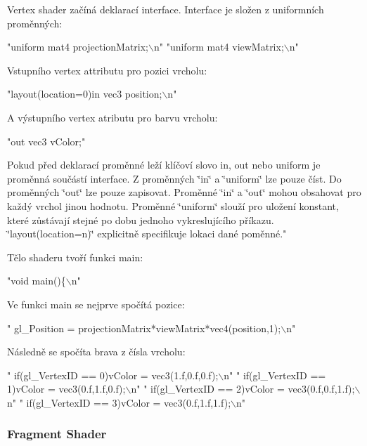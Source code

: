 Vertex shader začíná deklarací interface. Interface je složen z uniformních proměnných\-: 
\begin{DoxyCodeInclude}
\textcolor{stringliteral}{"uniform mat4 projectionMatrix;\(\backslash\)n"}
\textcolor{stringliteral}{"uniform mat4 viewMatrix;\(\backslash\)n"}
\end{DoxyCodeInclude}
Vstupního vertex attributu pro pozici vrcholu\-: 
\begin{DoxyCodeInclude}
\textcolor{stringliteral}{"layout(location=0)in vec3 position;\(\backslash\)n"}
\end{DoxyCodeInclude}
A výstupního vertex atributu pro barvu vrcholu\-: 
\begin{DoxyCodeInclude}
\textcolor{stringliteral}{"out vec3 vColor;"}
\end{DoxyCodeInclude}
Pokud před deklarací proměnné leží klíčoví slovo in, out nebo uniform je proměnná součástí interface. Z proměnných \char`\"{}in\char`\"{} a \char`\"{}uniform\char`\"{} lze pouze číst. Do proměnných \char`\"{}out\char`\"{} lze pouze zapisovat. Proměnné \char`\"{}in\char`\"{} a \char`\"{}out\char`\"{} mohou obsahovat pro každý vrchol jinou hodnotu. Proměnné \char`\"{}uniform\char`\"{} slouží pro uložení konstant, které zůstávají stejné po dobu jednoho vykreslujícího příkazu. \char`\"{}layout(location=n)\char`\"{} explicitně specifikuje lokaci dané poměnné."\par
 Tělo shaderu tvoří funkci main\-: 
\begin{DoxyCodeInclude}
\textcolor{stringliteral}{"void main()\{\(\backslash\)n"}
\end{DoxyCodeInclude}
Ve funkci main se nejprve spočítá pozice\-: 
\begin{DoxyCodeInclude}
\textcolor{stringliteral}{"  gl\_Position = projectionMatrix*viewMatrix*vec4(position,1);\(\backslash\)n"}
\end{DoxyCodeInclude}
Následně se spočíta brava z čísla vrcholu\-: 
\begin{DoxyCodeInclude}
\textcolor{stringliteral}{"  if(gl\_VertexID == 0)vColor = vec3(1.f,0.f,0.f);\(\backslash\)n"}
\textcolor{stringliteral}{"  if(gl\_VertexID == 1)vColor = vec3(0.f,1.f,0.f);\(\backslash\)n"}
\textcolor{stringliteral}{"  if(gl\_VertexID == 2)vColor = vec3(0.f,0.f,1.f);\(\backslash\)n"}
\textcolor{stringliteral}{"  if(gl\_VertexID == 3)vColor = vec3(0.f,1.f,1.f);\(\backslash\)n"}
\end{DoxyCodeInclude}
\hypertarget{quadExample.c_FragmentShader}{}\subsubsection{Fragment Shader}\label{quadExample.c_FragmentShader}
